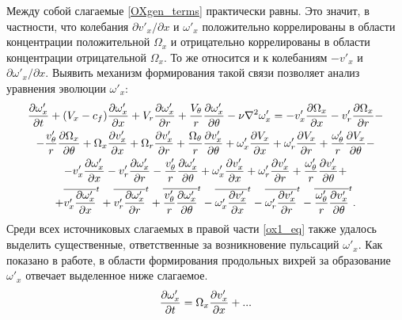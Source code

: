 Между собой слагаемые \eqref{OXgen_terms} практически равны. Это значит, в частности, что колебания $\partial v'_x / \partial x$ и $\omega'_x$ положительно коррелированы в области концентрации положительной $\Omega_x$ и отрицательно коррелированы в области концентрации отрицательной $\Omega_x$. То же относится и к колебаниям $-v'_x$ и $\partial \omega'_x / \partial x$. Выявить механизм формирования такой связи позволяет анализ уравнения эволюции $\omega'_x$:
\begin{multline}\label{ox1_eq}
\frac{\partial \omega'_x}{\partial t} + (V_x - c_f)\frac{\partial \omega'_x}{\partial x} + V_r \frac{\partial \omega_x'}{\partial r} + \frac{V_\theta}{r} \frac{\partial \omega'_x}{\partial \theta} 
- \nu\nabla^2\omega'_x = - v'_x \frac{\partial \Omega_x}{\partial x} - v'_r \frac{\partial \Omega_x}{\partial r} - \\ - \frac{v'_\theta}{r} \frac{\partial \Omega_x}{\partial \theta} 
+ \Omega_x \frac{\partial v'_x}{\partial x} + \Omega_r \frac{\partial v'_x}{\partial r} + \frac{\Omega_\theta}{r} \frac{\partial v'_x}{\partial \theta}
+ \omega'_x \frac{\partial V_x}{\partial x} + \omega'_r \frac{\partial V_x}{\partial r} + \frac{\omega'_\theta}{r} \frac{\partial V_x}{\partial \theta} - \\ 
- v'_x \frac{\partial \omega'_x}{\partial x} - v'_r \frac{\partial \omega'_x}{\partial r} - \frac{v'_\theta}{r} \frac{\partial \omega'_x}{\partial \theta} 
+ \omega'_x \frac{\partial v'_x}{\partial x} + \omega'_r \frac{\partial v'_x}{\partial r} + \frac{\omega'_\theta}{r} \frac{\partial v'_x}{\partial \theta} + \\
+ \overline{v'_x \frac{\partial \omega'_x}{\partial x}}^t + \overline{v'_r \frac{\partial \omega'_x}{\partial r}}^t + \overline{\frac{v'_\theta}{r} \frac{\partial \omega'_x}{\partial \theta}}^t
- \overline{\omega'_x \frac{\partial v'_x}{\partial x}}^t - \overline{\omega'_r \frac{\partial v'_x}{\partial r}}^t - \overline{\frac{\omega'_\theta}{r} \frac{\partial v'_x}{\partial \theta}}^t.
\end{multline}
Среди всех источниковых слагаемых в правой части \eqref{ox1_eq} также удалось выделить существенные, ответственные за возникновение пульсаций $\omega'_x$. Как показано в работе, в области формирования продольных вихрей за образование $\omega'_x$ отвечает выделенное ниже слагаемое.
\begin{equation}\label{ox1gen_main_terms}
\frac{\partial \omega'_x}{\partial t} = \Omega_x \frac {\partial v'_x}{\partial x} + ...
\end{equation}
